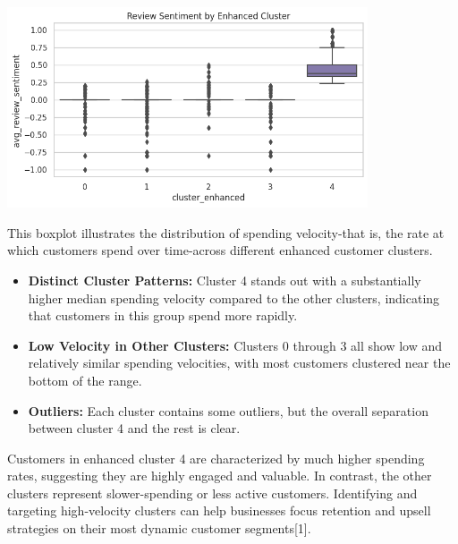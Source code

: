 \documentclass[a4paper]{article}
\begin{document}
\begin{multicols}{2}
\noindent
\begin{minipage}{\columnwidth}
\centering
\includegraphics[width=0.8\textwidth]{Spending Velocity by Enhanced Cluster.png}
\label{fig:spending_velocity_enhanced}
\end{minipage}

This boxplot illustrates the distribution of spending velocity-that is, the rate at which customers spend over time-across different enhanced customer clusters.

\begin{itemize}
    \item \textbf{Distinct Cluster Patterns:} Cluster 4 stands out with a substantially higher median spending velocity compared to the other clusters, indicating that customers in this group spend more rapidly.
    \item \textbf{Low Velocity in Other Clusters:} Clusters 0 through 3 all show low and relatively similar spending velocities, with most customers clustered near the bottom of the range.
    \item \textbf{Outliers:} Each cluster contains some outliers, but the overall separation between cluster 4 and the rest is clear.
\end{itemize}

Customers in enhanced cluster 4 are characterized by much higher spending rates, suggesting they are highly engaged and valuable. In contrast, the other clusters represent slower-spending or less active customers. Identifying and targeting high-velocity clusters can help businesses focus retention and upsell strategies on their most dynamic customer segments[1].




\end{multicols}
\end{document}
